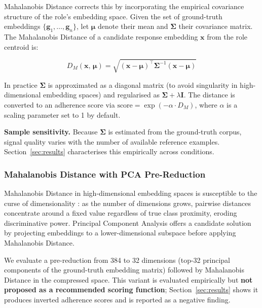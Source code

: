 \documentclass[11pt,a4paper]{article}
\begin{document}
Mahalanobis Distance \citep{mahalanobis1936generalised} corrects this by
incorporating the empirical covariance structure of the role's embedding space.
Given the set of ground-truth embeddings $\{\mathbf{g}_1, \ldots,
\mathbf{g}_n\}$, let $\boldsymbol{\mu}$ denote their mean and $\boldsymbol{\Sigma}$
their covariance matrix. The Mahalanobis Distance of a candidate response
embedding $\mathbf{x}$ from the role centroid is:

\begin{equation}
  D_M(\mathbf{x},\, \boldsymbol{\mu}) =
  \sqrt{(\mathbf{x} - \boldsymbol{\mu})^{\top}
  \boldsymbol{\Sigma}^{-1}
  (\mathbf{x} - \boldsymbol{\mu})}
  \label{eq:mahal}
\end{equation}

In practice $\boldsymbol{\Sigma}$ is approximated as a diagonal matrix (to
avoid singularity in high-dimensional embedding spaces) and regularised as
$\boldsymbol{\Sigma} + \lambda \mathbf{I}$. The distance is converted to an
adherence score via $\text{score} = \exp(-\alpha \cdot D_M)$, where $\alpha$
is a scaling parameter set to 1 by default.

\textbf{Sample sensitivity.} Because $\boldsymbol{\Sigma}$ is estimated from
the ground-truth corpus, signal quality varies with the number of available
reference examples. Section~\ref{sec:results} characterises this empirically
across conditions.

\subsubsection{Mahalanobis Distance with PCA Pre-Reduction}
\label{sec:pca_mahal}

Mahalanobis Distance in high-dimensional embedding spaces is susceptible to
the curse of dimensionality \citep{beyer1999nearest}: as the number of
dimensions grows, pairwise distances concentrate around a fixed value
regardless of true class proximity, eroding discriminative power. Principal
Component Analysis \citep{jolliffe2002pca} offers a candidate solution by
projecting embeddings to a lower-dimensional subspace before applying
Mahalanobis Distance.

We evaluate a pre-reduction from 384 to 32 dimensions (top-32 principal
components of the ground-truth embedding matrix) followed by Mahalanobis
Distance in the compressed space. This variant is evaluated empirically but
\textbf{not proposed as a recommended scoring function}; Section~\ref{sec:results}
shows it produces inverted adherence scores and is reported as a negative
finding.
\end{document}
